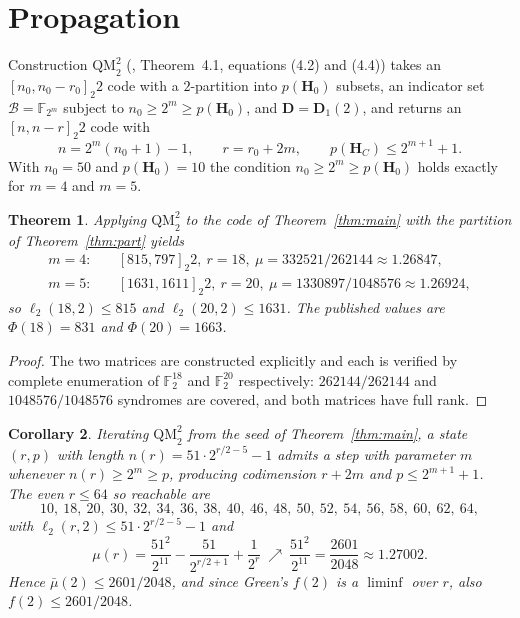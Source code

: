\documentclass[11pt,a4paper]{article}
\newtheorem{theorem}{Theorem}
\newtheorem{corollary}[theorem]{Corollary}
\theoremstyle{definition}
\theoremstyle{remark}
\newcommand{\FF}{\mathbb{F}}
\newcommand{\HH}{\boldsymbol{H}}
\begin{document}
\section{Propagation}

Construction $\mathrm{QM}_2^2$ (\cite{DMP2025}, Theorem~4.1, equations (4.2)
and (4.4)) takes an $[n_0,n_0-r_0]_2 2$ code with a $2$-partition into
$p(\HH_0)$ subsets, an indicator set $\mathscr B=\FF_{2^m}$ subject to
$n_0\ge2^m\ge p(\HH_0)$, and $\boldsymbol D=\boldsymbol D_1(2)$, and returns an
$[n,n-r]_2 2$ code with
\[
n=2^m(n_0+1)-1,\qquad r=r_0+2m,\qquad p(\HH_C)\le2^{m+1}+1 .
\]
With $n_0=50$ and $p(\HH_0)=10$ the condition $n_0\ge2^m\ge p(\HH_0)$ holds
exactly for $m=4$ and $m=5$.

\begin{theorem}\label{thm:prop}
Applying $\mathrm{QM}_2^2$ to the code of Theorem~\ref{thm:main} with the
partition of Theorem~\ref{thm:part} yields
\begin{align*}
m=4:&\quad [815,797]_2 2,\ r=18,\ \mu=332521/262144\approx1.26847,\\
m=5:&\quad [1631,1611]_2 2,\ r=20,\ \mu=1330897/1048576\approx1.26924,
\end{align*}
so $\ell_2(18,2)\le815$ and $\ell_2(20,2)\le1631$. The published values are
$\Phi(18)=831$ and $\Phi(20)=1663$.
\end{theorem}

\begin{proof}
The two matrices are constructed explicitly and each is verified by complete
enumeration of $\FF_2^{18}$ and $\FF_2^{20}$ respectively: $262144/262144$ and
$1048576/1048576$ syndromes are covered, and both matrices have full rank.
\end{proof}

\begin{corollary}\label{cor:family}
Iterating $\mathrm{QM}_2^2$ from the seed of Theorem~\ref{thm:main}, a state
$(r,p)$ with length $n(r)=51\cdot2^{r/2-5}-1$ admits a step with parameter $m$
whenever $n(r)\ge2^m\ge p$, producing codimension $r+2m$ and
$p\le2^{m+1}+1$. The even $r\le64$ so reachable are
\[
10,\ 18,\ 20,\ 30,\ 32,\ 34,\ 36,\ 38,\ 40,\ 46,\ 48,\ 50,\ 52,\ 54,\ 56,\
58,\ 60,\ 62,\ 64,
\]
with $\ell_2(r,2)\le51\cdot2^{r/2-5}-1$ and
\[
\mu(r)=\frac{51^2}{2^{11}}-\frac{51}{2^{r/2+1}}+\frac{1}{2^{r}}
\ \nearrow\ \frac{51^2}{2^{11}}=\frac{2601}{2048}\approx1.27002 .
\]
Hence $\bar\mu(2)\le2601/2048$, and since Green's $f(2)$ is a
$\liminf$ over $r$, also $f(2)\le2601/2048$.
\end{corollary}
\end{document}
